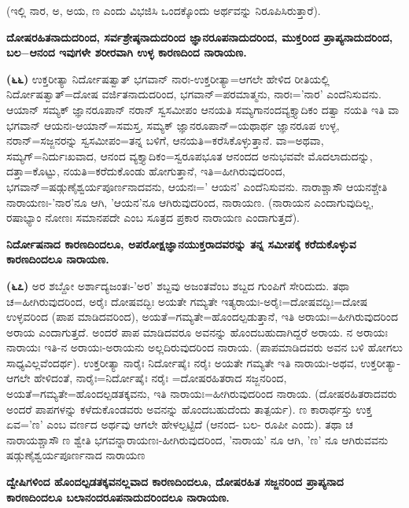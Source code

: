 (ಇಲ್ಲಿ ನಾರ, ಅ, ಅಯ, ಣ ಎಂದು ವಿಭಜಿಸಿ ಒಂದಕ್ಕೊಂದು ಅರ್ಥವನ್ನು ನಿರೂಪಿಸಿರುತ್ತಾರೆ).

\begin{center}
\textbf{ದೋಷರಹಿತನಾದುದರಿಂದ, ಸರ್ವಶ್ರೇಷ್ಠನಾದುದರಿಂದ ಜ್ಞಾನರೂಪನಾದುದರಿಂದ, ಮುಕ್ತರಿಂದ ಪ್ರಾಪ್ಯನಾದುದರಿಂದ, ಬಲ$-$ಆನಂದ ಇವುಗಳೇ ಶರೀರವಾಗಿ ಉಳ್ಳ ಕಾರಣದಿಂದ ನಾರಾಯಣ.}
\end{center}

\textbf{(೬೬)} ಉಕ್ತರೀತ್ಯಾ ನಿರ್ದೋಷತ್ವಾತ್ ಭಗವಾನ್ ನಾರಃ-ಉಕ್ತರೀತ್ಯಾ=ಆಗಲೇ ಹೇಳಿದ ರೀತಿಯಲ್ಲಿ ನಿರ್ದೋಷತ್ವಾತ್=ದೋಷ ವರ್ಜಿತನಾದುದರಿಂದ, ಭಗವಾನ್=ಪರಮಾತ್ಮನು, ನಾರಃ='ನಾರ' ಎಂದೆನಿಸುವನು. ಆಯಾನ್ ಸಮ್ಯಕ್ ಜ್ಞಾನರೂಪಾನ್ ನರಾನ್ ಸ್ವಸಮೀಪಂ ಆನಯತಿ ಸಮ್ಯಗಾನಂದವ್ಯಕ್ತ್ಯಾದಿಕಂ ದತ್ವಾ ನಯತಿ ಇತಿ ವಾ ಭಗವಾನ್ ಆಯನಃ-ಆಯಾನ್=ಸಮಸ್ತ, ಸಮ್ಯಕ್ ಜ್ಞಾನರೂಪಾನ್=ಯಥಾರ್ಥ ಜ್ಞಾನರೂಪ ಉಳ್ಳ, ನರಾನ್=ಸಜ್ಜನರನ್ನು ಸ್ವಸಮೀಪಂ=ತನ್ನ ಬಳಿಗೆ, ಆನಯತಿ=ಕರೆಸಿಕೊಳ್ಳುತ್ತಾನೆ. ವಾ=ಅಥವಾ, ಸಮ್ಯಗ್=\break ನಿರ್ದುಃಖವಾದ, ಆನಂದ ವ್ಯಕ್ತ್ಯಾದಿಕಂ=ಸ್ವರೂಪಭೂತ ಆನಂದದ ಅನುಭವವೇ ಮೊದಲಾದು\-ದನ್ನು, ದತ್ತಾ=ಕೊಟ್ಟು, ನಯತಿ=ಕರೆದುಕೊಂಡು ಹೋಗುತ್ತಾನೆ, ಇತಿ=ಹೀಗಿರುವುದರಿಂದ, ಭಗವಾನ್=ಷಡ್ಗುಣೈಶ್ವರ್ಯಪೂರ್ಣನಾದವನು, ಆಯನಃ=' ಆಯನ' ಎಂದೆನಿಸುವನು. ನಾರಾಶ್ಚಾಸೌ ಆಯನಶ್ಚೇತಿ ನಾರಾಯಣಃ-'ನಾರ'ನೂ ಆಗಿ, 'ಆಯನ'ನೂ ಆಗಿರುವುದರಿಂದ, ನಾರಾಯಣ. (ನಾರಾಯನ ಎಂದಾಗುವುದಿಲ್ಲ, ರಷಾಭ್ಯಾಂ ನೋಣಃ ಸಮಾನಪದೇ ಎಂಬ ಸೂತ್ರದ ಪ್ರಕಾರ ನಾರಾಯಣ ಎಂದಾಗುತ್ತದೆ).

\begin{center}
\textbf{ನಿರ್ದೋಷನಾದ ಕಾರಣದಿಂದಲೂ, ಅಪರೋಕ್ಷಜ್ಞಾನಯುಕ್ತರಾದವರನ್ನು ತನ್ನ ಸಮೀಪಕ್ಕೆ ಕರೆದುಕೊಳ್ಳುವ ಕಾರಣದಿಂದಲೂ ನಾರಾಯಣ.}
\end{center}

\textbf{(೬೭)} ಅರ ಶಬ್ದೋ ಅರ್ಶಾದ್ಯಜಂತಃ-'ಅರ' ಶಬ್ದವು ಅಜಂತವೆಂಬ ಶಬ್ದದ ಗುಂಪಿಗೆ ಸೇರಿದುದು. ತಥಾ ಚ=ಹೀಗಿರುವುದರಿಂದ, ಅರೈಃ ದೋಷವದ್ಭಿಃ ಅಯತೇ ಗಮ್ಯತೇ ಇತ್ಯರಾಯಃ-ಅರೈಃ=ದೋಷವದ್ಭಿಃ=ದೋಷ ಉಳ್ಳವರಿಂದ (ಪಾಪ ಮಾಡಿದವರಿಂದ), ಅಯತೆ=\break ಗಮ್ಯತೇ=ಹೊಂದಲ್ಪಡುತ್ತಾನೆ, ಇತಿ ಅರಾಯಃ=ಹೀಗಿರುವುದರಿಂದ ಅರಾಯ ಎಂದಾಗು\-ತ್ತದೆ. ಅಂದರೆ ಪಾಪ ಮಾಡಿದವರೂ ಅವನನ್ನು ಹೊಂದಬಹುದಾಗಿದ್ದರೆ ಅರಾಯ. ನ ಅರಾಯಃ ನಾರಾಯಃ ಇತಿ-ನ ಅರಾಯಃ-ಅರಾಯನು ಅಲ್ಲದಿರುವುದರಿಂದ ನಾರಾಯ. (ಪಾಪಮಾಡಿದವರು ಅವನ ಬಳಿ ಹೋಗಲು ಸಾಧ್ಯವಿಲ್ಲವೆಂದರ್ಥ). ಉಕ್ತರೀತ್ಯಾ ನಾರೈಃ ನಿರ್ದೋಷೈಃ ನರೈಃ ಅಯತೇ ಗಮ್ಯತೇ ಇತಿ ನಾರಾಯಃ-ಅಥವ, ಉಕ್ತರೀತ್ಯಾ-ಆಗಲೇ ಹೇಳಿದಂತೆ, ನಾರೈಃ=ನಿರ್ದೋಷೈಃ ನರೈಃ =ದೋಷರಹಿತರಾದ ಸಜ್ಜನರಿಂದ, ಅಯತೆ=ಗಮ್ಯತೇ=\-ಹೊಂದಲ್ಪಡತಕ್ಕವನು, ಇತಿ ನಾರಾಯಃ=ಹೀಗಿರುವುದರಿಂದ ನಾರಾಯ. (ದೋಷರಹಿತರಾದವರು ಅಂದರೆ ಪಾಪಗಳನ್ನು ಕಳೆದುಕೊಂಡವರು ಅವನನ್ನು ಹೊಂದಬಹುದೆಂದು ತಾತ್ಪರ್ಯ). ಣ ಕಾರಾರ್ಥಸ್ತು ಉಕ್ತ ಏವ='ಣ' ಎಂಬ ವರ್ಣದ ಅರ್ಥವು ಆಗಲೇ ಹೇಳಲ್ಪಟ್ಟಿದೆ (ಆನಂದ- ಬಲ- ರೂಪೀ ಎಂದು). ತಥಾ ಚ ನಾರಾಯಶ್ಚಾಸೌ ಣ ಶ್ವೇತಿ ಭಗವನ್ನಾರಾಯಣಃ-ಹೀಗಿರುವುದರಿಂದ, 'ನಾರಾಯ' ನೂ ಆಗಿ, 'ಣ' ನೂ ಆಗಿರುವವನು ಷಡ್ಗುಣೈಶ್ವರ್ಯಪೂರ್ಣನಾದ ನಾರಾಯಣ

\begin{center}
\textbf{ದ್ವೇಷಿಗಳಿಂದ ಹೊಂದಲ್ಪಡತಕ್ಕವನಲ್ಲವಾದ ಕಾರಣದಿಂದಲೂ, ದೋಷರಹಿತ ಸಜ್ಜನರಿಂದ ಪ್ರಾಪ್ಯನಾದ ಕಾರಣದಿಂದಲೂ ಬಲಾನಂದರೂಪನಾದುದರಿಂದಲೂ ನಾರಾಯಣ.}
\end{center}

